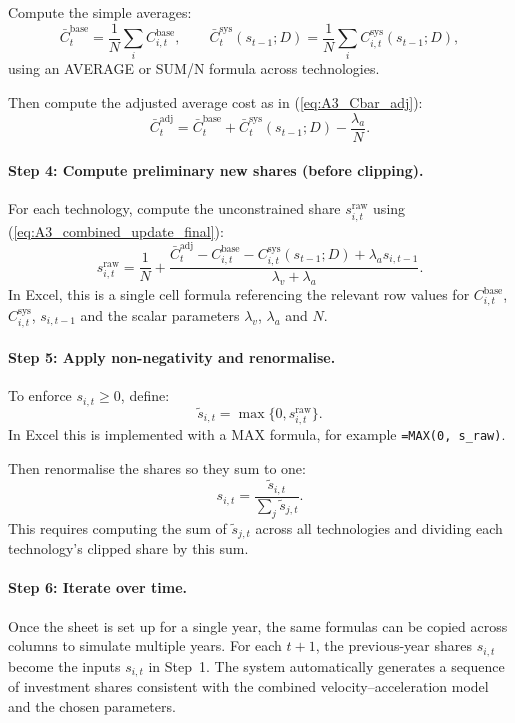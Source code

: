 \documentclass[preprint,authoryear,12pt]{elsarticle}
\begin{document}
Compute the simple averages:
\[
    \bar{C}_t^{\text{base}} = \frac{1}{N} \sum_i C_{i,t}^{\text{base}}, 
    \qquad
    \bar{C}_t^{\text{sys}}(s_{t-1};D) = \frac{1}{N} \sum_i C_{i,t}^{\text{sys}}(s_{t-1};D),
\]
using an AVERAGE or SUM/N formula across technologies.

Then compute the adjusted average cost as in (\ref{eq:A3_Cbar_adj}):
\[
    \bar{C}_t^{\text{adj}}
    = \bar{C}_t^{\text{base}} + \bar{C}_t^{\text{sys}}(s_{t-1};D) - \frac{\lambda_a}{N}.
\]

\paragraph{Step 4: Compute preliminary new shares (before clipping).}

For each technology, compute the unconstrained share $s_{i,t}^{\text{raw}}$ using
(\ref{eq:A3_combined_update_final}):
\[
    s_{i,t}^{\text{raw}}
    = \frac{1}{N}
      + \frac{
            \bar{C}_t^{\text{adj}}
          - C_{i,t}^{\text{base}}
          - C_{i,t}^{\text{sys}}(s_{t-1};D)
          + \lambda_a s_{i,t-1}
        }{\lambda_v + \lambda_a}.
\]
In Excel, this is a single cell formula referencing the relevant row values for $C_{i,t}^{\text{base}}$,
$C_{i,t}^{\text{sys}}$, $s_{i,t-1}$ and the scalar parameters $\lambda_v$, $\lambda_a$ and $N$.

\paragraph{Step 5: Apply non-negativity and renormalise.}

To enforce $s_{i,t} \ge 0$, define:
\[
    \tilde{s}_{i,t} = \max\{0, s_{i,t}^{\text{raw}}\}.
\]
In Excel this is implemented with a MAX formula, for example
\texttt{=MAX(0, s\_raw)}.

Then renormalise the shares so they sum to one:
\[
    s_{i,t} = \frac{\tilde{s}_{i,t}}{\sum_j \tilde{s}_{j,t}}.
\]
This requires computing the sum of $\tilde{s}_{j,t}$ across all technologies and dividing each
technology’s clipped share by this sum.

\paragraph{Step 6: Iterate over time.}

Once the sheet is set up for a single year, the same formulas can be copied across columns to
simulate multiple years. For each $t+1$, the previous-year shares $s_{i,t}$ become the inputs
$s_{i,t}$ in Step~1. The system automatically generates a sequence of investment shares
consistent with the combined velocity–acceleration model and the chosen parameters.
\end{document}
